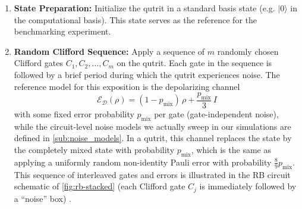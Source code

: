 \begin{enumerate}
    \item \textbf{State Preparation:} Initialize the qutrit in a standard basis state (e.g. $|0\rangle$ in the computational basis). This state serves as the reference for the benchmarking experiment.

    \item \textbf{Random Clifford Sequence:} Apply a sequence of $m$ randomly chosen Clifford gates $C_1, C_2, \dots, C_m$ on the qutrit. Each gate in the sequence is followed by a brief period during which the qutrit experiences noise. The reference model for this exposition is the depolarizing channel
    \begin{equation}
        \mathcal{E}_{\mathcal{D}}(\rho)= (1-p_{\mathrm{mix}})\,\rho+\frac{p_{\mathrm{mix}}}{3}\,I
        \label{eq:1-depol}
    \end{equation}
    with some fixed error probability $p_{\mathrm{mix}}$ per gate (gate-independent noise), while the circuit-level noise models we actually sweep in our simulations are defined in \autoref{sub:noise_models}. In a qutrit, this channel replaces the state by the completely mixed state with probability $p_{\mathrm{mix}}$, which is the same as applying a uniformly random non-identity Pauli error with probability $\tfrac{8}{9}p_{\mathrm{mix}}$. This sequence of interleaved gates and errors is illustrated in the RB circuit schematic of \autoref{fig:rb-stacked} (each Clifford gate $C_j$ is immediately followed by a “noise” box) \cite{NielsenChuang2010,Emerson2005}.
    

\end{enumerate}
